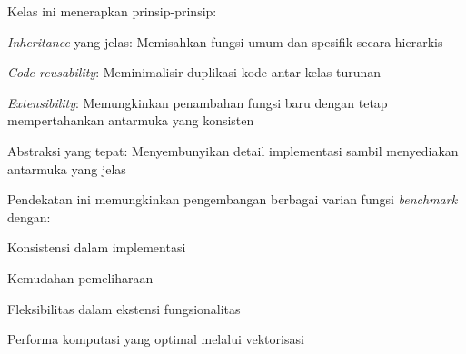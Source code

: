 Kelas ini menerapkan prinsip-prinsip:
\begin{packed_enum}
	\item \textit{Inheritance} yang jelas: Memisahkan fungsi umum dan spesifik secara hierarkis
	\item \textit{Code reusability}: Meminimalisir duplikasi kode antar kelas turunan
	\item \textit{Extensibility}: Memungkinkan penambahan fungsi baru dengan tetap mempertahankan antarmuka yang konsisten
	\item Abstraksi yang tepat: Menyembunyikan detail implementasi sambil menyediakan antarmuka yang jelas
\end{packed_enum}
Pendekatan ini memungkinkan pengembangan berbagai varian fungsi \textit{benchmark} dengan:
\begin{packed_enum}
	\item Konsistensi dalam implementasi
	\item Kemudahan pemeliharaan
	\item Fleksibilitas dalam ekstensi fungsionalitas
	\item Performa komputasi yang optimal melalui vektorisasi
\end{packed_enum}

